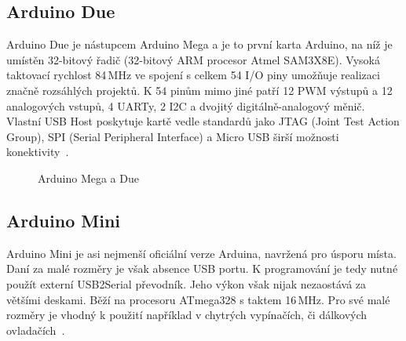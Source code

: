 		\subsection{Arduino Due} 
		Arduino Due je nástupcem Arduino Mega a je to první karta Arduino, na níž je umístěn 32-bitový řadič (32-bitový ARM procesor
		Atmel SAM3X8E). Vysoká taktovací rychlost 84\,MHz ve spojení s celkem 54 I/O piny umožňuje realizaci značně rozsáhlých projektů. K 54 pinům mimo jiné patří 12 PWM výstupů a 12 analogových vstupů, 4 UARTy, 2 I2C a dvojitý digitálně-analogový měnič. Vlastní USB Host poskytuje kartě vedle standardů jako JTAG (Joint Test Action Group), SPI (Serial Peripheral Interface) a Micro USB širší možnosti konektivity~\cite{ArduinoDue}.	

\begin{figure}[!ht]
    \centering
			\hspace*{5mm}
		\caption{Arduino Mega a Due}
		\vspace{-20pt}	
\end{figure}


	\subsection{Arduino Mini} 
	Arduino Mini je asi nejmenší oficiální verze Arduina, navržená pro úsporu místa. Daní za malé rozměry je však absence USB portu. K programování je tedy nutné použít externí USB2Serial převodník. Jeho výkon však nijak nezaostává za většími deskami. Běží na procesoru ATmega328 s taktem 16\,MHz. Pro své malé rozměry je vhodný k použití například v chytrých vypínačích, či dálkových ovladačích~\cite{ArduinoMini}.	
	
